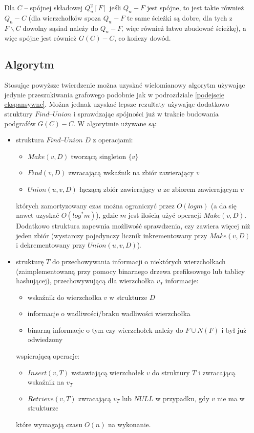 \documentclass{pracamgr}
\begin{document}
     Dla $C$ -- spójnej składowej $Q_n^2[F]$ jeśli $Q_n-F$ jest spójne, to jest takie również $Q_n-C$
     (dla wierzchołków spoza $Q_n-F$ te same ścieżki są dobre, dla tych z  $F\backslash C$ dowolny sąsiad należy do $Q_n-F$, więc również łatwo zbudować ścieżkę),
     a więc spójne jest również $G(C)-C$, co kończy dowód.
   \subsection{Algorytm}
    Stosując powyższe twierdzenie można uzyskać wielomianowy algorytm używając jedynie przeszukiwania grafowego
    podobnie jak w podrozdziale \ref{podejscie ekspansywne}. Można jednak uzyskać lepsze rezultaty używając dodatkowo struktury $Find$--$Union$ i sprawdzając
    spójności już w trakcie budowania podgrafów $G(C)-C$.\newline
    W algorytmie używane są:
    \begin{itemize}[noitemsep,topsep=4pt]
     \item struktura $Find$--$Union$ $D$ z operacjami:
      \begin{itemize}[noitemsep,topsep=0pt]
       \item $Make(v,D)$ tworzącą singleton $\{v\}$
       \item $Find(v,D)$ zwracającą wskaźnik na zbiór zawierający $v$
       \item $Union(u,v,D)$ łączącą zbiór zawierający $u$ ze zbiorem zawierającym $v$
      \end{itemize}
      których zamortyzowany czas można ograniczyć przez $O(log m)$ (a da się nawet uzyskać $O(log^*m)$), gdzie $m$ jest ilością użyć
      operacji $Make(v,D)$.
      Dodatkowo struktura zapewnia możliwość sprawdzenia, czy zawiera więcej niż jeden zbiór (wystarczy pojedynczy licznik inkrementowany przy
      $Make(v,D)$ i dekrementowany przy $Union(u,v,D)$).
      \vspace*{4pt}
     \item strukturę $T$ do przechowywania informacji o niektórych wierzchołkach
     (zaimplementowaną przy pomocy binarnego drzewa prefiksowego lub tablicy hashującej),
      przechowywującą dla wierzchołka $v_T$ informacje:
      \begin{itemize}[noitemsep,topsep=0pt]
       \item wskaźnik do wierzchołka $v$ w strukturze $D$
       \item informacje o wadliwości/braku wadliwości wierzchołka
       \item binarną informacje o tym czy wierzchołek należy do $F\cup N(F)$ i był już odwiedzony
      \end{itemize}
      wspierającą operacje:
      \begin{itemize}[noitemsep,topsep=0pt]
       \item $Insert(v,T)$ wstawiającą wierzchołek $v$ do struktury $T$ i zwracającą wskaźnik na $v_T$
       \item $Retrieve(v,T)$ zwracającą $v_T$ lub $NULL$ w przypadku, gdy $v$ nie ma w strukturze
      \end{itemize}
      które wymagają czasu $O(n)$ na wykonanie.
    \end{itemize}
    
\end{document}
